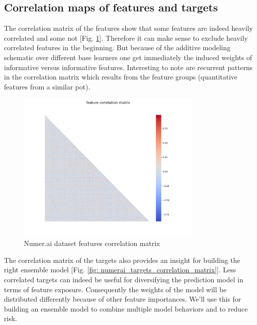 \documentclass[12pt, a4paper]{article}
\begin{document}
\subsection{Correlation maps of features and targets}
The correlation matrix of the features show that some features are indeed heavily correlated and some not [Fig. \ref{fig: numerai_features_correlation_matrix}]. Therefore it can make sense to exclude heavily correlated features in the beginning. But because of the additive modeling schematic over different base learners one get immediately the induced weights of informative versus informative features.
Interesting to note are recurrent patterns in the correlation matrix which results from the feature groups (quantitative features from a similar pot).
\begin{figure}[!htpb]
    \centering
    \includegraphics[width=0.8\textwidth,trim={0 0 0 0},clip]{figures/feature_correlations_matrix_2023-09-28.png}
    \caption[Numer.ai dataset features correlation matrix]{Numer.ai dataset features correlation matrix}
    \label{fig: numerai_features_correlation_matrix}    
\end{figure}
The correlation matrix of the targets also provides an insight for building the right ensemble model [Fig. \ref{fig: numerai_targets_correlation_matrix}]. Less correlated targets can indeed be useful for diversifying the prediction model in terms of feature exposure. Consequently the weights of the model will be distributed differently because of other feature importances. We'll use this for building an ensemble model to combine multiple model behaviors and to reduce risk. 
\end{document}
